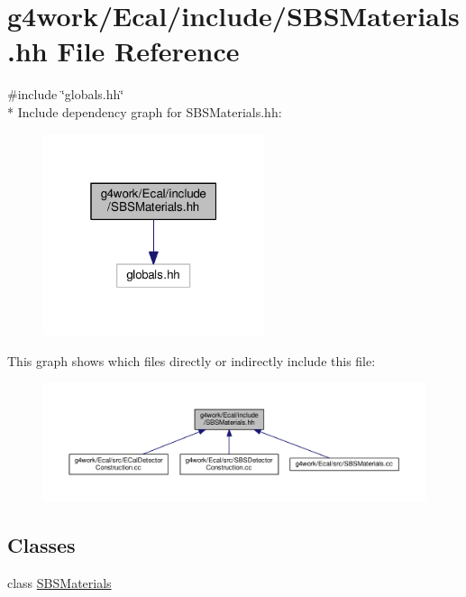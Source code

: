 \hypertarget{_s_b_s_materials_8hh}{\section{g4work/\-Ecal/include/\-S\-B\-S\-Materials.hh File Reference}
\label{_s_b_s_materials_8hh}
}
{\ttfamily \#include \char`\"{}globals.\-hh\char`\"{}}\\*
Include dependency graph for S\-B\-S\-Materials.\-hh\-:\nopagebreak
\begin{figure}[H]
\begin{center}
\leavevmode
\includegraphics[width=184pt]{_s_b_s_materials_8hh__incl}
\end{center}
\end{figure}
This graph shows which files directly or indirectly include this file\-:\nopagebreak
\begin{figure}[H]
\begin{center}
\leavevmode
\includegraphics[width=350pt]{_s_b_s_materials_8hh__dep__incl}
\end{center}
\end{figure}
\subsection*{Classes}
\begin{DoxyCompactItemize}
\item 
class \hyperlink{class_s_b_s_materials}{S\-B\-S\-Materials}
\end{DoxyCompactItemize}
